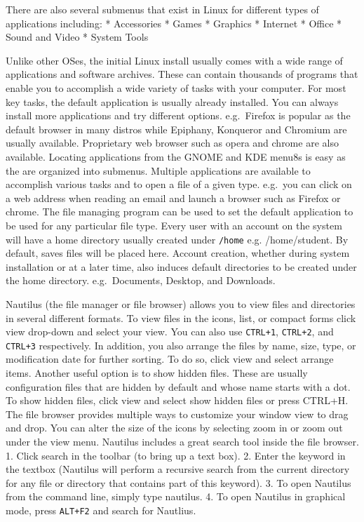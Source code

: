 There are also several submenus that exist in Linux for different types
of applications including: * Accessories * Games * Graphics * Internet *
Office * Sound and Video * System Tools

Unlike other OSes, the initial Linux install usually comes with a wide
range of applications and software archives. These can contain thousands
of programs that enable you to accomplish a wide variety of tasks with
your computer. For most key tasks, the default application is usually
already installed. You can always install more applications and try
different options. e.g.~Firefox is popular as the default browser in
many distros while Epiphany, Konqueror and Chromium are usually
available. Proprietary web browser such as opera and chrome are also
available. Locating applications from the GNOME and KDE menu8s is easy
as the are organized into submenus. Multiple applications are available
to accomplish various tasks and to open a file of a given type. e.g.~you
can click on a web address when reading an email and launch a browser
such as Firefox or chrome. The file managing program can be used to set
the default application to be used for any particular file type. Every
user with an account on the system will have a home directory usually
created under \texttt{/home} e.g. /home/student. By default, saves files
will be placed here. Account creation, whether during system
installation or at a later time, also induces default directories to be
created under the home directory. e.g.~Documents, Desktop, and
Downloads.

Nautilus (the file manager or file browser) allows you to view files and
directories in several different formats. To view files in the icons,
list, or compact forms click view drop-down and select your view. You
can also use \texttt{CTRL+1}, \texttt{CTRL+2}, and \texttt{CTRL+3}
respectively. In addition, you also arrange the files by name, size,
type, or modification date for further sorting. To do so, click view and
select arrange items. Another useful option is to show hidden files.
These are usually configuration files that are hidden by default and
whose name starts with a dot. To show hidden files, click view and
select show hidden files or press CTRL+H. The file browser provides
multiple ways to customize your window view to drag and drop. You can
alter the size of the icons by selecting zoom in or zoom out under the
view menu. Nautilus includes a great search tool inside the file
browser. 1. Click search in the toolbar (to bring up a text box). 2.
Enter the keyword in the textbox (Nautilus will perform a recursive
search from the current directory for any file or directory that
contains part of this keyword). 3. To open Nautilus from the command
line, simply type nautilus. 4. To open Nautilus in graphical mode, press
\texttt{ALT+F2} and search for Nautlius.

